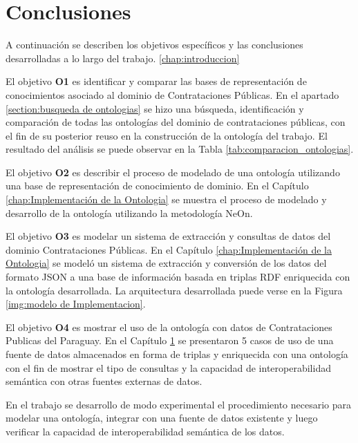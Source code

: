 \section{Conclusiones}
\label{chap:analisis}
A continuación se describen los objetivos específicos y las conclusiones desarrolladas a lo largo del trabajo. \ref{chap:introduccion} 

El objetivo \textbf{O1} es identificar y comparar las bases de representación de conocimientos asociado al dominio de Contrataciones Públicas. En el apartado \ref{section:busqueda de ontologias} se hizo una búsqueda, identificación y comparación de todas las ontologías del dominio de contrataciones públicas, con el fin de su posterior reuso en la construcción de la ontología del trabajo. El resultado del análisis se puede observar en la Tabla \ref{tab:comparacion_ontologias}.

El objetivo \textbf{O2} es describir el proceso de modelado de una ontología utilizando una base de representación de conocimiento de dominio. En el Capítulo \ref{chap:Implementación de la Ontologia} se muestra el proceso de modelado y desarrollo de la ontología utilizando la metodología NeOn.

El objetivo \textbf{O3} es modelar un sistema de extracción y consultas de datos del dominio Contrataciones Públicas. En el Capítulo \ref{chap:Implementación de la Ontologia} se modeló un sistema de extracción y conversión de los datos del formato JSON a una base de información basada en triplas RDF enriquecida con la ontología desarrollada. La arquitectura desarrollada puede verse en la Figura \ref{img:modelo de Implementacion}.

El objetivo \textbf{O4} es mostrar el uso de la ontología con datos de Contrataciones Publicas del Paraguay. En el Capítulo \ref{chap:analisis} se presentaron 5 casos de uso de una fuente de datos almacenados en forma de triplas y enriquecida con una ontología con el fin de mostrar el tipo de consultas y la capacidad de interoperabilidad semántica con otras fuentes externas de datos. 

En el trabajo se desarrollo de modo experimental el procedimiento necesario para modelar una ontología, integrar con una fuente de datos existente y luego verificar la capacidad de interoperabilidad semántica de los datos. 